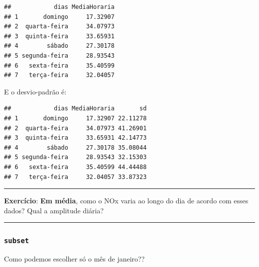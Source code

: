 \documentclass[]{book}
\newenvironment{Shaded}{\begin{snugshade}}{\end{snugshade}}
\newcommand{\KeywordTok}[1]{\textcolor[rgb]{0.13,0.29,0.53}{\textbf{#1}}}
\newcommand{\DataTypeTok}[1]{\textcolor[rgb]{0.13,0.29,0.53}{#1}}
\newcommand{\StringTok}[1]{\textcolor[rgb]{0.31,0.60,0.02}{#1}}
\newcommand{\CommentTok}[1]{\textcolor[rgb]{0.56,0.35,0.01}{\textit{#1}}}
\newcommand{\OperatorTok}[1]{\textcolor[rgb]{0.81,0.36,0.00}{\textbf{#1}}}
\newcommand{\NormalTok}[1]{#1}
\theoremstyle{definition}
\theoremstyle{definition}
\theoremstyle{definition}
\theoremstyle{remark}
\begin{document}
\begin{verbatim}
##            dias MediaHoraria
## 1       domingo     17.32907
## 2  quarta-feira     34.07973
## 3  quinta-feira     33.65931
## 4        sábado     27.30178
## 5 segunda-feira     28.93543
## 6   sexta-feira     35.40599
## 7   terça-feira     32.04057
\end{verbatim}

E o desvio-padrão é:

\begin{Shaded}
\end{Shaded}

\begin{verbatim}
##            dias MediaHoraria       sd
## 1       domingo     17.32907 22.11278
## 2  quarta-feira     34.07973 41.26901
## 3  quinta-feira     33.65931 42.14773
## 4        sábado     27.30178 35.08044
## 5 segunda-feira     28.93543 32.15303
## 6   sexta-feira     35.40599 44.44488
## 7   terça-feira     32.04057 33.87323
\end{verbatim}

\begin{center}\rule{0.5\linewidth}{\linethickness}\end{center}

{\textbf{Exercício}: \textbf{Em média}, como o NOx varia ao longo do dia
de acordo com esses dados? Qual a amplitude diária?}

\begin{center}\rule{0.5\linewidth}{\linethickness}\end{center}

\subsubsection{\texorpdfstring{\texttt{subset}}{subset}}\label{subset}

Como podemos escolher só o mês de janeiro??

\begin{Shaded}
\end{Shaded}
\end{document}
